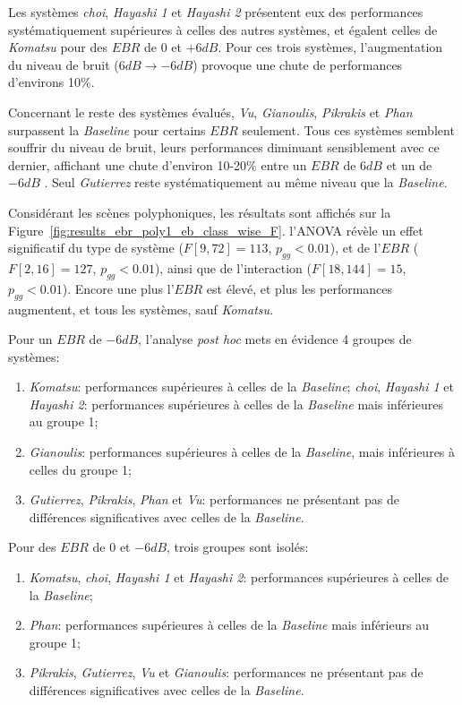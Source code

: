 Les systèmes \emph{choi}, \emph{Hayashi 1} et \emph{Hayashi 2} présentent eux des performances systématiquement supérieures à celles des autres systèmes, et égalent celles de \emph{Komatsu} pour des $EBR$ de $0$ et $+6dB$. Pour ces trois systèmes, l'augmentation du niveau de bruit ($6dB\rightarrow -6dB$) provoque une chute de performances d'environs 10\%.

Concernant le reste des systèmes évalués, \emph{Vu}, \emph{Gianoulis}, \emph{Pikrakis} et \emph{Phan} surpassent la \emph{Baseline} pour certains $EBR$ seulement. Tous ces systèmes semblent souffrir du niveau de bruit, leurs performances diminuant sensiblement avec ce dernier, affichant une chute d'environ 10-20\% entre un $EBR$ de $6dB$ et un de $-6dB$ . Seul \emph{Gutierrez} reste systématiquement au même niveau que la \emph{Baseline}.

Considérant les scènes polyphoniques, les résultats sont affichés sur la Figure~\ref{fig:results_ebr_poly1_eb_class_wise_F}. l'ANOVA révèle un effet significatif du type de système ($F[9,72]=113$, $p_{gg}<0.01$), et de l'$EBR$ ($F[2,16]=127$, $p_{gg}<0.01$), ainsi que de l'interaction ($F[18,144]=15$, $p_{gg}<0.01$). Encore une plus l'$EBR$ est élevé, et plus les performances augmentent, et tous les systèmes, sauf \emph{Komatsu}.

Pour un $EBR$ de $-6dB$, l'analyse \emph{post hoc} mets en évidence 4 groupes de systèmes:

\begin{enumerate}
\item \emph{Komatsu}: performances supérieures à celles de la \emph{Baseline};
\emph{choi}, \emph{Hayashi 1} et \emph{Hayashi 2}: performances supérieures à celles de la \emph{Baseline} mais inférieures au groupe 1;
\item \emph{Gianoulis}: performances supérieures à celles de la \emph{Baseline}, mais inférieures à celles du groupe 1;
\item \emph{Gutierrez}, \emph{Pikrakis}, \emph{Phan} et \emph{Vu}: performances ne présentant pas de différences significatives avec celles de la \emph{Baseline}.
\end{enumerate}

Pour des $EBR$ de $0$ et $-6dB$, trois groupes sont isolés: 

\begin{enumerate}
\item \emph{Komatsu}, \emph{choi}, \emph{Hayashi 1} et \emph{Hayashi 2}: performances supérieures à celles de la \emph{Baseline};
\item \emph{Phan}: performances supérieures à celles de la \emph{Baseline} mais inférieurs au groupe 1;
\item \emph{Pikrakis}, \emph{Gutierrez}, \emph{Vu} et \emph{Gianoulis}: performances ne présentant pas de différences significatives avec celles de la \emph{Baseline}.
\end{enumerate}

